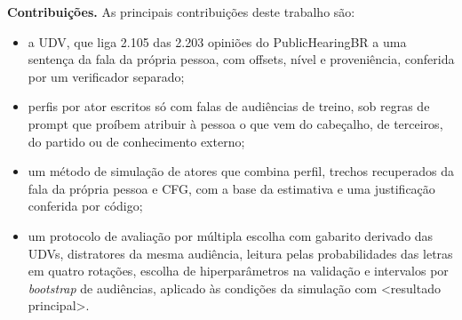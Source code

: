\medskip\noindent\textbf{Contribui\c{c}\~oes.} As principais contribui\c{c}\~oes deste trabalho s\~ao:
\begin{itemize}
  \itemsep2pt
  \item a UDV, que liga 2.105 das 2.203 opiniões do PublicHearingBR a uma sentença da fala da própria
  pessoa, com offsets, nível e proveniência, conferida por um verificador separado;
  \item perfis por ator escritos só com falas de audiências de treino, sob regras de prompt que
  proíbem atribuir à pessoa o que vem do cabeçalho, de terceiros, do partido ou de conhecimento
  externo;
  \item um método de simulação de atores que combina perfil, trechos recuperados da fala da própria
  pessoa e CFG, com a base da estimativa e uma justificação conferida por código;
  \item um protocolo de avaliação por múltipla escolha com gabarito derivado das UDVs, distratores da
  mesma audiência, leitura pelas probabilidades das letras em quatro rotações, escolha de
  hiperparâmetros na validação e intervalos por \textit{bootstrap} de audiências, aplicado às
  condições da simulação com <resultado principal>.
\end{itemize}
